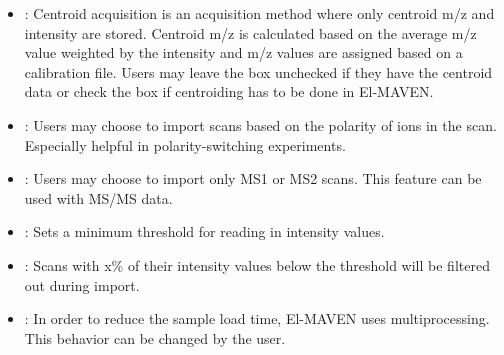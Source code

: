 \documentclass[letterpaper,10pt,english,openany,oneside]{sphinxmanual}
\begin{document}
\begin{itemize}
\item {} 
: Centroid acquisition is an acquisition method where only centroid m/z and intensity are stored. Centroid m/z is calculated based on the average m/z value weighted by the intensity and m/z values are assigned based on a calibration file. Users may leave the box unchecked if they have the centroid data or check the box if centroiding has to be done in El-MAVEN.

\item {} 
: Users may choose to import scans based on the polarity of ions in the scan. Especially helpful in polarity-switching experiments.

\item {} 
: Users may choose to import only MS1 or MS2 scans. This feature can be used with MS/MS data.

\item {} 
: Sets a minimum threshold for reading in intensity values.

\item {} 
: Scans with x\% of their intensity values below the threshold will be filtered out during import.

\item {} 
: In order to reduce the sample load time, El-MAVEN uses multiprocessing. This behavior can be changed by the user.

\end{itemize}


\end{document}
